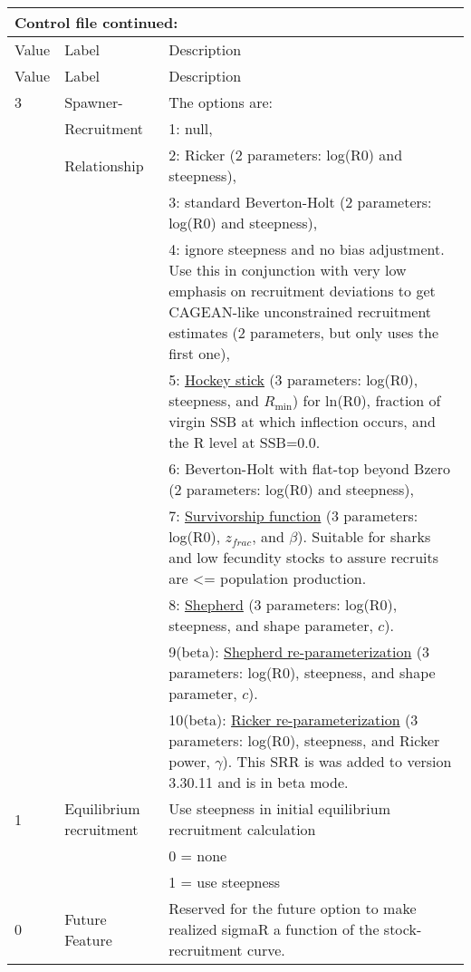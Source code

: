 \begin{longtable}{p{1cm} p{3cm} p{11cm}}
	\multicolumn{3}{l}{Control file continued:}\\
	\hline
	Value & Label &  Description\Tstrut\Bstrut\\
	\hline
	\endfirsthead

	\hline
	Value & Label &  Description\Tstrut\Bstrut\\
	\hline
	\endhead
	\hline
	\endfoot
	\endlastfoot

	3 & Spawner-            & The options are: \Tstrut\\
	  & Recruitment         & 1: null, \\
	  & Relationship        & 2: Ricker (2 parameters: log(R0) and steepness), \\
	  &                     & 3: standard Beverton-Holt (2 parameters: log(R0) and steepness), \\
	  &                     & 4: ignore steepness and no bias adjustment.  Use this in conjunction with very low emphasis on recruitment deviations to get CAGEAN-like unconstrained recruitment estimates (2 parameters, but only uses the first one),\\
	  &                     & 5: \hyperlink{Hockey}{Hockey stick} (3 parameters: log(R0), steepness, and $R_{\text{min}}$) for ln(R0), fraction of virgin SSB at which inflection occurs, and the R level at SSB=0.0. \\
	  &                     & 6: Beverton-Holt with flat-top beyond Bzero (2 parameters: log(R0) and steepness),\\
	  &                     & 7: \hyperlink{Survivorship}{Survivorship function} (3 parameters: log(R0), $z_{frac}$, and $\beta$).  Suitable for sharks and low fecundity stocks to assure recruits are <= population production.\\
      &                     & 8: \hyperlink{Shepherd}{Shepherd} (3 parameters: log(R0), steepness, and shape parameter, $c$).\\
      & 					& 9(beta): \hyperlink{Shepherd2}{Shepherd re-parameterization} (3 parameters: log(R0), steepness, and shape parameter, $c$).\\
      & 					& 10(beta): \hyperlink{Ricker2}{Ricker re-parameterization} (3 parameters: log(R0), steepness, and Ricker power, $\gamma$). This SRR is was added to version 3.30.11 and is in beta mode.\Bstrut\\
    \hline

    1 \Tstrut & Equilibrium recruitment & Use steepness in initial equilibrium recruitment calculation \\
      & 						& 0 = none \\
      &							& 1 = use steepness \\
    0 &  Future Feature         & Reserved for the future option to make realized sigmaR a function of the stock-recruitment curve.\Bstrut\\ 
    \hline
\end{longtable}

